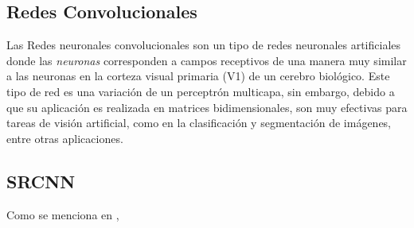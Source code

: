 \subsection{Redes Convolucionales}
\noindent
Las Redes neuronales convolucionales son  un tipo de redes neuronales artificiales  donde las \emph{neuronas}
corresponden a campos receptivos de una manera muy similar a las neuronas en la corteza visual primaria (V1) de un cerebro
biológico.  Este tipo de red es una variación de un perceptrón multicapa, sin embargo, debido a que su aplicación es realizada
en matrices bidimensionales, son muy efectivas para tareas de visión artificial, como en la clasificación y segmentación 
de imágenes, entre otras aplicaciones.

\subsection{SRCNN}
Como se menciona en \cite{freeman},